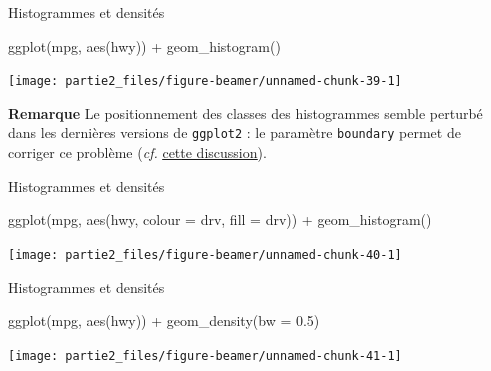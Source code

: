 \documentclass[12pt,ignorenonframetext,]{beamer}
\newenvironment{Shaded}{}{}
\newcommand{\KeywordTok}[1]{\textcolor[rgb]{0.00,0.00,1.00}{#1}}
\newcommand{\DataTypeTok}[1]{#1}
\newcommand{\FloatTok}[1]{#1}
\newcommand{\StringTok}[1]{\textcolor[rgb]{0.00,0.50,0.50}{#1}}
\newcommand{\OperatorTok}[1]{#1}
\newcommand{\NormalTok}[1]{#1}
\renewenvironment{Shaded}{\begin{snugshade}}{\end{snugshade}}
\newcommand{\intertitre}[1]{\textcolor{redInsee}{\textbf{#1}}}
\begin{document}
\begin{frame}[fragile]{Histogrammes et densités}

\footnotesize \center

\vspace{-0.3cm}

\begin{Shaded}
\begin{Highlighting}[]
\KeywordTok{ggplot}\NormalTok{(mpg, }\KeywordTok{aes}\NormalTok{(hwy)) }\OperatorTok{+}\StringTok{ }\KeywordTok{geom_histogram}\NormalTok{()}
\end{Highlighting}
\end{Shaded}

\texttt{[image: partie2\_files/figure-beamer/unnamed-chunk-39-1]}

\pause \raggedright \small \vspace{-0.3cm}

\intertitre{Remarque} Le positionnement des classes des histogrammes
semble perturbé dans les dernières versions de \texttt{ggplot2} : le
paramètre \texttt{boundary} permet de corriger ce problème (\emph{cf.}
\href{http://stackoverflow.com/questions/37876096/geom-histogram-wrong-bins}{\underline{cette discussion}}).

\end{frame}

\begin{frame}[fragile]{Histogrammes et densités}

\footnotesize \center

\begin{Shaded}
\begin{Highlighting}[]
\KeywordTok{ggplot}\NormalTok{(mpg, }\KeywordTok{aes}\NormalTok{(hwy, }\DataTypeTok{colour =}\NormalTok{ drv, }\DataTypeTok{fill =}\NormalTok{ drv)) }\OperatorTok{+}\StringTok{ }
\StringTok{  }\KeywordTok{geom_histogram}\NormalTok{()}
\end{Highlighting}
\end{Shaded}

\texttt{[image: partie2\_files/figure-beamer/unnamed-chunk-40-1]}

\end{frame}

\begin{frame}[fragile]{Histogrammes et densités}

\footnotesize \center

\begin{Shaded}
\begin{Highlighting}[]
\KeywordTok{ggplot}\NormalTok{(mpg, }\KeywordTok{aes}\NormalTok{(hwy)) }\OperatorTok{+}\StringTok{ }\KeywordTok{geom_density}\NormalTok{(}\DataTypeTok{bw =} \FloatTok{0.5}\NormalTok{)}
\end{Highlighting}
\end{Shaded}

\texttt{[image: partie2\_files/figure-beamer/unnamed-chunk-41-1]}

\end{frame}
\end{document}
